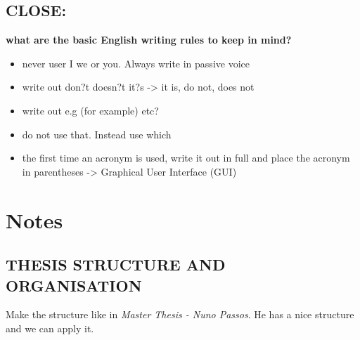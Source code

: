 \section{CLOSE:}
\textbf{what are the basic English writing rules to keep in mind?}\\
\begin{itemize}
\item never user I we or you. Always write in passive voice
\item write out don?t doesn?t it?s -> it is, do not, does not
\item write out e.g (for example) etc?
\item do not use that. Instead use which
\item the first time an acronym is used, write it out in full and place the acronym in parentheses -> Graphical User Interface (GUI)
\end{itemize}
\chapter{Notes}
\section{THESIS STRUCTURE AND ORGANISATION}
Make the structure like in \textit{Master Thesis - Nuno Passos}. He has a nice structure and we can apply it.

